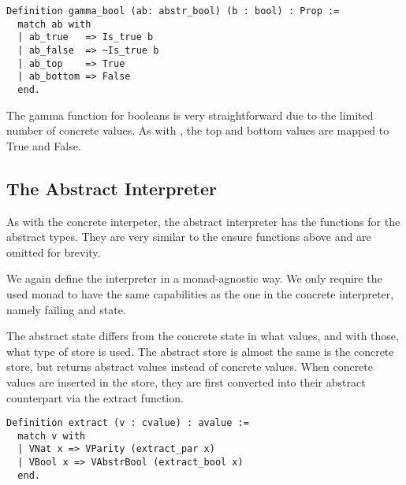 \begin{verbatim}
Definition gamma_bool (ab: abstr_bool) (b : bool) : Prop :=
  match ab with
  | ab_true   => Is_true b
  | ab_false  => ~Is_true b
  | ab_top    => True
  | ab_bottom => False
  end.
\end{verbatim}

The gamma function for booleans is very straightforward due to the limited
number of concrete values. As with , the top and bottom
values are mapped to True and False.

\subsection{The Abstract Interpreter}
As with the concrete interpeter, the abstract interpreter has the
 functions for the abstract types. 
They are very similar to the ensure functions above and are omitted for brevity. 

We again define the interpreter in a monad-agnostic way. We only require the
used monad to have the same capabilities as the one in the concrete
interpreter, namely failing and state.

The abstract state differs from the concrete state in what values, and with
those, what type of store is
used. The abstract store is almost the same is the concrete store, but returns
abstract values instead of concrete values. When concrete values are inserted
in the store, they are first converted into their abstract counterpart via the
extract function.

\begin{listing}[H]
\begin{verbatim}
Definition extract (v : cvalue) : avalue :=
  match v with
  | VNat x => VParity (extract_par x)
  | VBool x => VAbstrBool (extract_bool x)
  end.
\end{verbatim}
\end{listing}

